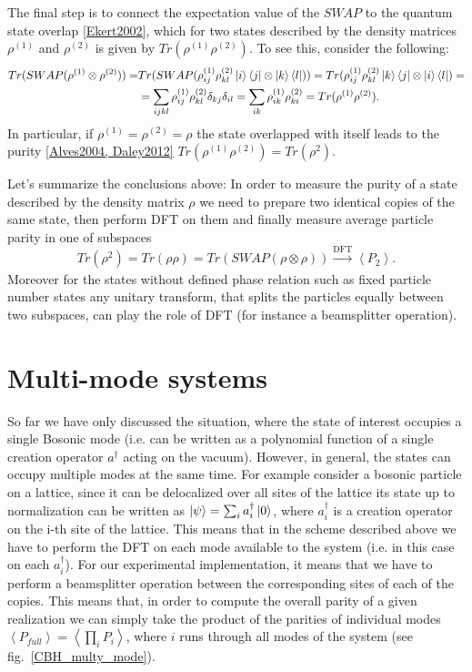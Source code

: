The final step is to connect the expectation value of the $SWAP$ to the quantum state overlap \ref{Ekert2002}, which for two states described by the density matrices $\rho^{(1)}$ and $\rho^{(2)}$ is given by $Tr(\rho^{(1)} \rho^{(2)})$. To see this, consider the following:
\begin{equation}
\begin{aligned}
Tr(SWAP(\rho^{(1)} \otimes \rho^{(2)})) =& Tr(SWAP(\rho^{(1)}_{ij} \rho^{(2)}_{kl} \left|i\right\rangle\left\langle j\right| \otimes \left|k\right\rangle\left\langle l\right|)) =Tr(\rho^{(1)}_{ij} \rho^{(2)}_{kl} \left|k\right\rangle\left\langle j\right| \otimes \left|i\right\rangle\left\langle l\right|) = \\
&=\sum_{ijkl}\rho^{(1)}_{ij} \rho^{(2)}_{kl} \delta_{kj} \delta_{il} = \sum_{ik}\rho^{(1)}_{ik} \rho^{(2)}_{ki} = Tr(\rho^{(1)} \rho^{(2)}).
\end{aligned}
\end{equation}
In particular, if $\rho^{(1)}=\rho^{(2)}=\rho$ the state overlapped with itself leads to the purity \ref{Alves2004, Daley2012} $Tr(\rho^{(1)} \rho^{(2)}) = Tr(\rho^2)$.

Let's summarize the conclusions above: In order to measure the purity of a state described by the density matrix $\rho$ we need to prepare two identical copies of the same state, then perform DFT on them and finally measure average particle parity in one of subspaces
\begin{equation}
Tr(\rho^2) = Tr(\rho\rho) = Tr(SWAP(\rho \otimes \rho)) \xrightarrow[]{\text{DFT}} \left< P_2 \right>.
\end{equation}
Moreover for the states without defined phase relation such as fixed particle number states any unitary transform, that splits the particles equally between two subspaces, can play the role of DFT (for instance a beamsplitter operation).

\section{Multi-mode systems}
So far we have only discussed the situation, where the state of interest occupies a single Bosonic mode (i.e. can be written as a polynomial function of a single creation operator $a^{\dagger}$ acting on the vacuum). However, in general, the states can occupy multiple modes at the same time. For example consider a bosonic particle on a lattice, since it can be delocalized over all sites of the lattice its state up to normalization can be written as $\left|\psi\right\rangle = \sum_i a_i^{\dagger} \left|0\right\rangle$, where $a_i^{\dagger}$ is a creation operator on the i-th site of the lattice. This means that in the scheme described above we have to perform the DFT on each mode available to the system (i.e. in this case on each $a_i^{\dagger}$). For our experimental implementation, it means that we have to perform a beamsplitter operation between the corresponding sites of each of the copies. This means that, in order to compute the overall parity of a given realization we can simply take the product of the parities of individual modes $\left<P_{full}\right> = \left< \prod_i P_i \right>$, where $i$ runs through all modes of the system (see fig.~\ref{CBH_multy_mode}).

